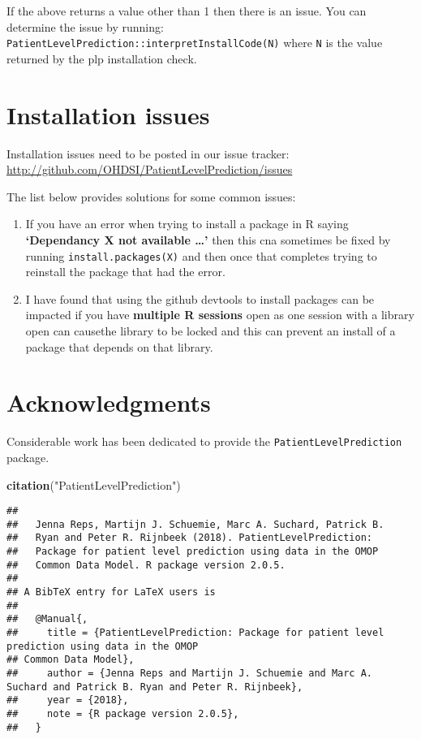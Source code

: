\documentclass[]{article}
\newenvironment{Shaded}{\begin{snugshade}}{\end{snugshade}}
\newcommand{\KeywordTok}[1]{\textcolor[rgb]{0.13,0.29,0.53}{\textbf{#1}}}
\newcommand{\StringTok}[1]{\textcolor[rgb]{0.31,0.60,0.02}{#1}}
\newcommand{\NormalTok}[1]{#1}
\begin{document}
If the above returns a value other than 1 then there is an issue. You
can determine the issue by running:
\texttt{PatientLevelPrediction::interpretInstallCode(N)} where
\texttt{N} is the value returned by the plp installation check.

\section{Installation issues}\label{installation-issues}

Installation issues need to be posted in our issue tracker:
\url{http://github.com/OHDSI/PatientLevelPrediction/issues}

The list below provides solutions for some common issues:

\begin{enumerate}
\def\labelenumi{\arabic{enumi}.}
\item
  If you have an error when trying to install a package in R saying
  \textbf{`Dependancy X not available \ldots{}'} then this cna sometimes
  be fixed by running
  \texttt{install.packages(\textquotesingle{}X\textquotesingle{})} and
  then once that completes trying to reinstall the package that had the
  error.
\item
  I have found that using the github devtools to install packages can be
  impacted if you have \textbf{multiple R sessions} open as one session
  with a library open can causethe library to be locked and this can
  prevent an install of a package that depends on that library.
\end{enumerate}

\section{Acknowledgments}\label{acknowledgments}

Considerable work has been dedicated to provide the
\texttt{PatientLevelPrediction} package.

\begin{Shaded}
\begin{Highlighting}[]
\KeywordTok{citation}\NormalTok{(}\StringTok{"PatientLevelPrediction"}\NormalTok{)}
\end{Highlighting}
\end{Shaded}

\begin{verbatim}
## 
##   Jenna Reps, Martijn J. Schuemie, Marc A. Suchard, Patrick B.
##   Ryan and Peter R. Rijnbeek (2018). PatientLevelPrediction:
##   Package for patient level prediction using data in the OMOP
##   Common Data Model. R package version 2.0.5.
## 
## A BibTeX entry for LaTeX users is
## 
##   @Manual{,
##     title = {PatientLevelPrediction: Package for patient level prediction using data in the OMOP
## Common Data Model},
##     author = {Jenna Reps and Martijn J. Schuemie and Marc A. Suchard and Patrick B. Ryan and Peter R. Rijnbeek},
##     year = {2018},
##     note = {R package version 2.0.5},
##   }
\end{verbatim}
\end{document}
